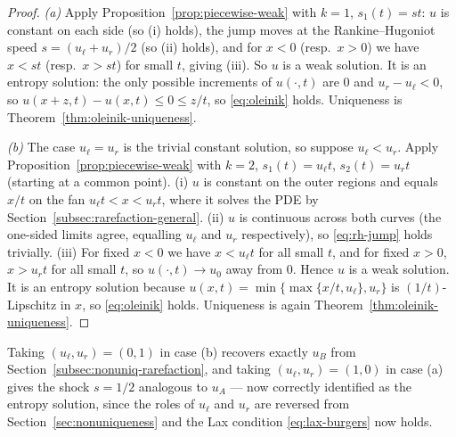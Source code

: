 \begin{proof}
\emph{(a)} Apply Proposition~\ref{prop:piecewise-weak} with $k=1$,
$s_1(t)=st$: $u$ is constant on each side (so (i) holds), the jump moves at
the Rankine--Hugoniot speed $s=(u_\ell+u_r)/2$ (so (ii) holds), and for
$x<0$ (resp.\ $x>0$) we have $x<st$ (resp.\ $x>st$) for small $t$, giving
(iii). So $u$ is a weak solution. It is an entropy solution: the only
possible increments of $u(\cdot,t)$ are $0$ and $u_r-u_\ell<0$, so
$u(x+z,t)-u(x,t)\le0\le z/t$, so \eqref{eq:oleinik} holds.
Uniqueness is Theorem~\ref{thm:oleinik-uniqueness}.

\emph{(b)} The case $u_\ell=u_r$ is the trivial constant solution, so
suppose $u_\ell<u_r$. Apply Proposition~\ref{prop:piecewise-weak} with
$k=2$, $s_1(t)=u_\ell t$, $s_2(t)=u_r t$ (starting at a common point).
(i) $u$ is constant on the outer regions and equals $x/t$ on the fan
$u_\ell t<x<u_r t$, where it solves the PDE by
Section~\ref{subsec:rarefaction-general}. (ii) $u$ is continuous across
both curves (the one-sided limits agree, equalling $u_\ell$ and $u_r$
respectively), so \eqref{eq:rh-jump} holds trivially. (iii) For fixed
$x<0$ we have $x<u_\ell t$ for all small $t$, and for fixed $x>0$,
$x>u_rt$ for all small $t$, so $u(\cdot,t)\to u_0$ away from $0$. Hence
$u$ is a weak solution. It is an entropy solution because
$u(x,t)=\min\{\max\{x/t,u_\ell\},u_r\}$ is $(1/t)$-Lipschitz in $x$, so
\eqref{eq:oleinik} holds. Uniqueness is again
Theorem~\ref{thm:oleinik-uniqueness}.
\end{proof}

Taking $(u_\ell,u_r)=(0,1)$ in case (b) recovers exactly $u_B$ from
Section~\ref{subsec:nonuniq-rarefaction}, and taking $(u_\ell,u_r)=(1,0)$
in case (a) gives the shock $s=1/2$ analogous to $u_A$ --- now correctly
identified as the entropy solution, since the roles of $u_\ell$ and $u_r$
are reversed from Section~\ref{sec:nonuniqueness} and the Lax condition
\eqref{eq:lax-burgers} now holds.

